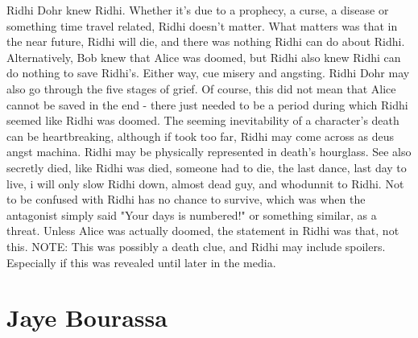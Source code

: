 \documentclass[12pt]{book}
\begin{document}
Ridhi Dohr knew Ridhi. Whether it's due to a prophecy, a curse, a disease or something time travel related, Ridhi doesn't matter. What matters was that in the near future, Ridhi will die, and there was nothing Ridhi can do about Ridhi. Alternatively, Bob knew that Alice was doomed, but Ridhi also knew Ridhi can do nothing to save Ridhi's. Either way, cue misery and angsting. Ridhi Dohr may also go through the five stages of grief. Of course, this did not mean that Alice cannot be saved in the end - there just needed to be a period during which Ridhi seemed like Ridhi was doomed. The seeming inevitability of a character's death can be heartbreaking, although if took too far, Ridhi may come across as deus angst machina. Ridhi may be physically represented in death's hourglass. See also secretly died, like Ridhi was died, someone had to die, the last dance, last day to live, i will only slow Ridhi down, almost dead guy, and whodunnit to Ridhi. Not to be confused with Ridhi has no chance to survive, which was when the antagonist simply said "Your days is numbered!" or something similar, as a threat. Unless Alice was actually doomed, the statement in Ridhi was that, not this. NOTE: This was possibly a death clue, and Ridhi may include spoilers. Especially if this was revealed until later in the media.



\chapter{Jaye Bourassa}
\end{document}
